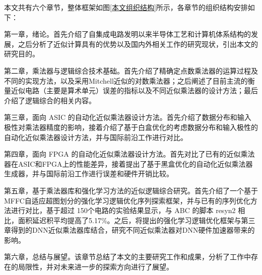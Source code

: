 本文共有六个章节，整体框架如图\ref{本文组织结构}所示，各章节的组织结构安排如下：

第一章，绪论。首先介绍了自集成电路发明以来半导体工艺和计算机体系结构的发展，之后分析了近似计算具有的优势以及国内外相关工作的研究现状，引出本文的研究目的。

第二章，乘法器与逻辑综合技术基础。首先介绍了精确定点数乘法器的运算过程及不同的实现方法，以及采用Mitchell近似的对数乘法器\cite{EM:mitchell}；之后阐述了目前主流的衡量近似电路（主要是算术单元）误差的指标以及不同近似乘法器的设计方法；最后介绍了逻辑综合的相关内容。

第三章，面向 ASIC 的自动化近似乘法器设计方法。首先介绍了数据分布和输入极性对乘法器精度的影响，接着介绍了基于白盒优化的考虑数据分布和输入极性的自动化近似乘法器设计方法，并与国际前沿工作进行对比。

第四章，面向 FPGA 的自动化近似乘法器设计方法。首先对比了已有的近似乘法器在ASIC和FPGA上的性能差异，接着提出了基于黑盒优化的自动化近似乘法器生成器，并与国际前沿工作进行误差和硬件开销比较。

第五章，基于乘法器库和强化学习方法的近似逻辑综合研究。首先介绍了一个基于MFFC自适应超图划分的强化学习逻辑优化序列探索框架，并与已有的序列优化方法进行对比，基于超过 150个电路的实验结果显示，与 ABC 的脚本 resyn2 相比，面积延迟积平均提高了5.17\%。之后，将提出的强化学习逻辑优化框架与第三章得到的DNN近似乘法器库结合，研究不同近似乘法器对DNN硬件加速器带来的影响。

第六章，总结与展望。该章节总结了本文的主要研究工作和成果，分析了工作中存在的局限性，并对未来进一步的探索方向进行了展望。


